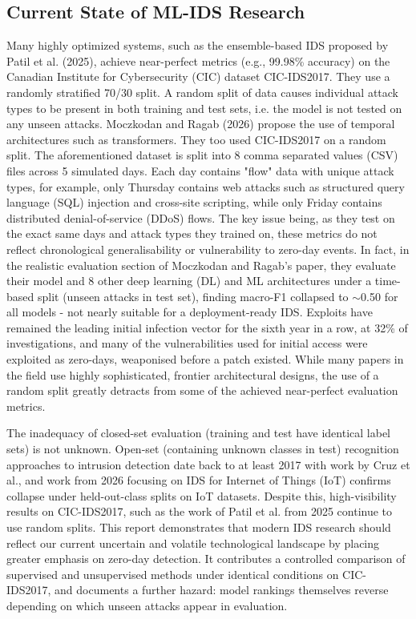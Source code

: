 \documentclass{article}
\begin{document}
\subsection{Current State of ML-IDS Research}
Many highly optimized systems, such as the ensemble-based IDS proposed by Patil et al. (2025)\parencite{Patil2025}, achieve near-perfect metrics (e.g., 99.98\% accuracy) on the Canadian Institute for Cybersecurity (CIC) dataset CIC-IDS2017. They use a randomly stratified 70/30 split. A random split of data causes individual attack types to be present in both training and test sets, i.e. the model is not tested on any unseen attacks. Moczkodan and Ragab (2026)\parencite{moczkodan2026} propose the use of temporal architectures such as transformers. They too used CIC-IDS2017 on a random split. The aforementioned dataset is split into 8 comma separated values (CSV) files across 5 simulated days. Each day contains "flow" data with unique attack types, for example, only Thursday contains web attacks such as structured query language (SQL) injection and cross-site scripting, while only Friday contains distributed denial-of-service (DDoS) flows. The key issue being, as they test on the exact same days and attack types they trained on, these metrics do not reflect chronological generalisability or vulnerability to zero-day events. In fact, in the realistic evaluation section of Moczkodan and Ragab's paper, they evaluate their model and 8 other deep learning (DL) and ML architectures under a time-based split (unseen attacks in test set), finding macro-F1 collapsed to $\sim$0.50 for all models - not nearly suitable for a deployment-ready IDS. Exploits have remained the leading initial infection vector for the sixth year in a row, at 32\% of investigations, and many of the vulnerabilities used for initial access were exploited as zero-days, weaponised before a patch existed\parencite{mandiant_mtrends2026}. While many papers in the field use highly sophisticated, frontier architectural designs, the use of a random split greatly detracts from some of the achieved near-perfect evaluation metrics. 
\par The inadequacy of closed-set evaluation (training and test have identical label sets) is not unknown. Open-set (containing unknown classes in test) recognition approaches to intrusion detection date back to at least 2017 with work by Cruz et al.\parencite{7943467}, and work from 2026 focusing on IDS for Internet of Things (IoT) confirms collapse under held-out-class splits on IoT datasets\parencite{Chettri2026AnalyzingSA}. Despite this, high-visibility results on CIC-IDS2017, such as the work of Patil et al. from 2025\parencite{Patil2025} continue to use random splits. This report demonstrates that modern IDS research should reflect our current uncertain and volatile technological landscape by placing greater emphasis on zero-day detection. It contributes a controlled comparison of supervised and unsupervised methods under identical conditions on CIC-IDS2017, and documents a further hazard: model rankings themselves reverse depending on which unseen attacks appear in evaluation.
\end{document}
